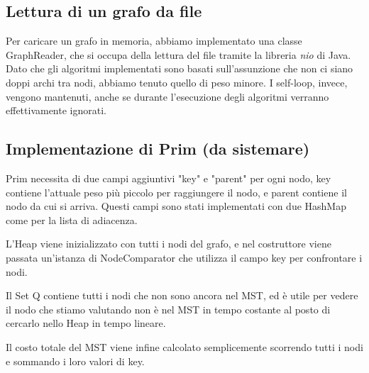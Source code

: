 \subsection{Lettura di un grafo da file}
Per caricare un grafo in memoria, abbiamo implementato una classe GraphReader, che si occupa della lettura del file tramite la libreria \textit{nio} di Java. Dato che gli algoritmi implementati sono basati sull'assunzione che non ci siano doppi archi tra nodi,
abbiamo tenuto quello di peso minore. I self-loop, invece, vengono mantenuti, anche se durante l'esecuzione degli algoritmi verranno effettivamente ignorati.
\subsection{Implementazione di Prim (da sistemare)} 
Prim necessita di due campi aggiuntivi "key" e "parent" per ogni nodo, key contiene l'attuale peso più piccolo per raggiungere il nodo, e parent contiene il nodo da cui si arriva. Questi campi sono stati implementati con due HashMap come per la lista di adiacenza.

L'Heap viene inizializzato con tutti i nodi del grafo, e nel costruttore viene passata un'istanza di NodeComparator che utilizza il campo key per confrontare i nodi.

Il Set Q contiene tutti i nodi che non sono ancora nel MST, ed è utile per vedere il nodo che stiamo valutando non è nel MST in tempo costante al posto di cercarlo nello Heap in tempo lineare.

Il costo totale del MST viene infine calcolato semplicemente scorrendo tutti i nodi e sommando i loro valori di key.